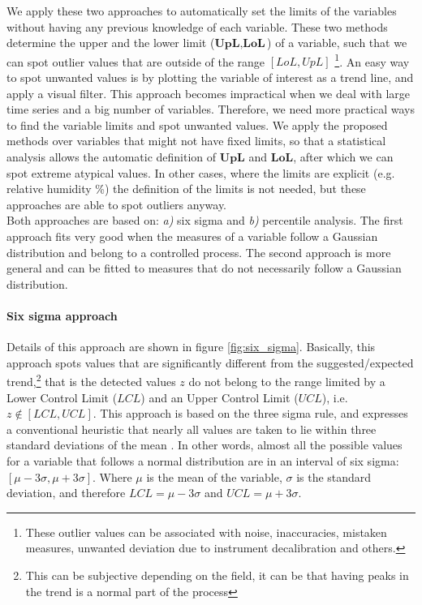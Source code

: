 We apply these two approaches to automatically set the limits of the variables without having any previous knowledge of each variable. These two methods determine the upper and the lower limit ($\textbf{UpL}, \textbf{LoL}$) of a variable, such that we can spot outlier values that are outside of the range $[LoL,UpL]$ \footnote{These outlier values can be associated with noise, inaccuracies, mistaken measures, unwanted deviation due to instrument decalibration and others.}. An easy way to spot unwanted values is by plotting the variable of interest as a trend line, and apply a visual filter. This approach becomes impractical when we deal with large time series and a big number of variables.  Therefore, we need more practical ways to find the variable limits and spot unwanted values. We apply the proposed methods over variables that might not have fixed limits, so that a statistical analysis allows the automatic definition of $\textbf{UpL}$ and $\textbf{LoL}$, after which we can spot extreme atypical values. In other cases, where the limits are explicit (e.g. relative humidity \%) the definition of the limits is not needed, but these approaches are able to spot outliers anyway. \\

Both approaches are based on: \textit{a)} six sigma and \textit{b)} percentile analysis. The first approach fits very good when the measures of a variable follow a Gaussian distribution and belong to a controlled process. The second approach is more general and can be fitted to measures that do not necessarily follow a Gaussian distribution.
  

\paragraph{Six sigma approach}

Details of this approach are shown in figure \ref{fig:six_sigma}. Basically, this approach spots values that are significantly different from the suggested/expected trend,\footnote{This can be subjective depending on the field, it can be that having peaks in the trend is a normal part of the process} that is the detected values $z$ do not belong to the range limited by a Lower Control Limit ($LCL$) and an Upper Control Limit ($UCL$), i.e. $z \not \in [LCL, UCL]$. This approach is based on the three sigma rule, and expresses a conventional heuristic that nearly all values are taken to lie within three standard deviations of the mean  \cite{wiborg2014applied,miller2015automated}. In other words, almost all the possible values for a variable that follows a normal distribution are in an interval of six sigma: $[\mu - 3\sigma, \mu + 3\sigma]$. Where $\mu$ is the mean of the variable, $\sigma$ is the standard deviation, and therefore $LCL = \mu - 3 \sigma$ and $UCL = \mu + 3\sigma$. \\

